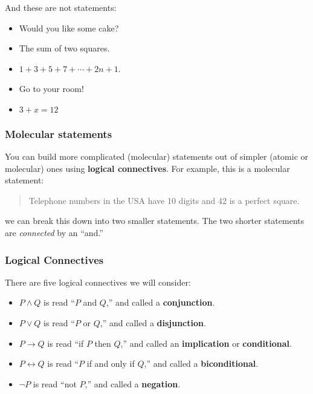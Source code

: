 \documentclass[11pt, compress]{beamer}
\newcommand{\terminology}[1]{\textbf{#1}}\newcommand{\lt}{<}
\renewcommand{\iff}{\leftrightarrow}
\newcommand{\imp}{\rightarrow}
\begin{document}
\begin{frame}
\frametitle{}
\begin{example}[0.2.1]And these are not statements:\begin{itemize}
\item{} Would you like some cake?


\item{} The sum of two squares.


\item{} \(1+3+5+7+\cdots+2n+1\).

\item{} Go to your room!


\item{} \(3+x = 12\)

\end{itemize}

\end{example}
\end{frame}
 
\begin{frame}
\frametitle{Molecular statements}
 You can build more complicated (molecular) statements out of simpler (atomic or molecular) ones using \terminology{logical connectives}. For example, this is a molecular statement:
 \begin{quote}%
Telephone numbers in the USA have 10 digits and 42 is a perfect square.
\end{quote}
 we can break this down into two smaller statements. The two shorter statements are \emph{connected} by an ``and.''
\end{frame}
 
\begin{frame}
\frametitle{Logical Connectives}
 There are five logical connectives we will consider:
\pause 

\begin{itemize}[<+->]
\item{} \(P \wedge Q\) is read ``\(P\) and \(Q\),'' and called a \terminology{conjunction}.

\item{} \(P \vee Q\) is read ``\(P\) or \(Q\),'' and called a \terminology{disjunction}.

\item{} \(P \imp Q\) is read ``if \(P\) then \(Q\),'' and called an \terminology{implication} or \terminology{conditional}.

\item{} \(P \iff Q\) is read ``\(P\) if and only if \(Q\),'' and called a \terminology{biconditional}.

\item{} \(\neg P\) is read ``not \(P\),'' and called a \terminology{negation}.
\end{itemize}

\end{frame}
 
\end{document}
